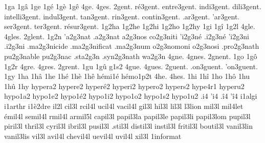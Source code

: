 {1ga
1gâ
1ge
1gé
1gè
1gê
4ge.
4ges.
       2gent.
     ré3gent.
  entre3gent.
   indi3gent.
   dili3gent.
intelli3gent.
  indul3gent.
    tan3gent.
    rin3gent.
 contin3gent.
    .ar3gent.
    'ar3gent.
    ser3gent.
    ter3gent.
résur3gent.
%
1g2ha
1g2he
1g2hi
1g2ho
1g2hy
1gi
1gî
1g2l
4gle.
4gles.
2glent. %
    1g2n
  'a2g3nat     %
  .a2g3nat     %
   a2g3nos     %
  co2g3niti    %
  'i2g3né      %
  .i2g3né      %
  'i2g3ni      %
  .i2g3ni      %
 .ma2g3nicide  %
 .ma2g3nificat %
 .ma2g3num     %
   o2g3nomoni  %
   o2g3nosi    %
.pro2g3nath    %
  pu2g3nable   %
  pu2g3nac     %
.sta2g3n
.syn2g3nath    %
  wa2g3n
4gne.
4gnes.
2gnent. %
1go
1gô
1g2r
4gre.
4gres.
2grent. %
1gu
1gû
g1s2
4gue.
4gues.
   2guent.
.on3guent.
'on3guent.
%
1gy
1ha
1hâ
1he
1hé
1hè
1hê
                    hémi1é
                    hémo1p2t
4he.
4hes.
1hi
1hî
1ho
1hô
1hu
1hû
1hy
                    hypera2
                    hypere2
                    hyperé2
                    hyperi2
                    hypero2
                    hypers2
                    hype4r1
                    hyperu2
                    hypo1a2
                    hypo1e2 %
                    hypo1é2
                    hypo1i2
                    hypo1o2
                    hypo1s2
                    hypo1u2
.i4
'i4
.î4
'î4
                    i1algi
                    i1arthr
                    i1è2dre
    il2l
   cil3l
  rcil4l
  ucil4l
 vacil4l
   gil3l
   hil3l
   lil3l
     l3lion
   mil3l
   mil4let
  émil4l
 semil4l
  rmil4l
 armil5l
 capil3l
 papil3la
 papil3le
 papil3li
 papil3lom
 pupil3l
 piril3l
 thril3l
 cyril3l
 ibril3l
 pusil3l
 .stil3l
distil3l
instil3l
fritil3l
boutil3l
 vanil3lin
 vanil3lis
   vil3l
  avil4l
chevil4l
 uevil4l
  uvil4l
   xil3l
                    1informat %
}
